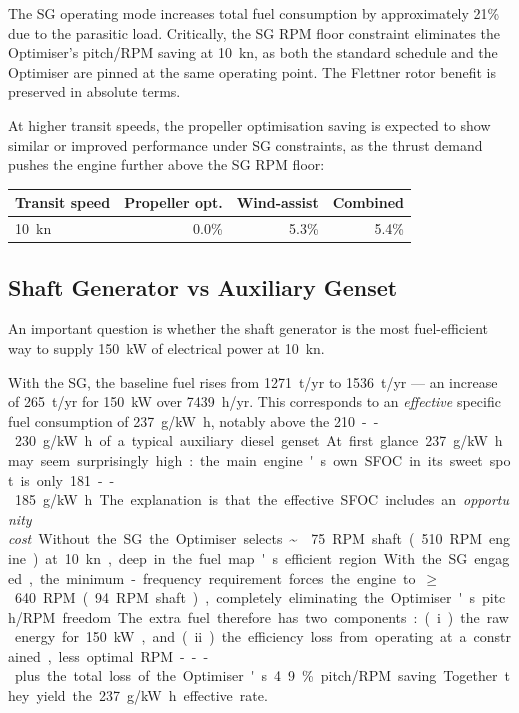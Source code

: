 \documentclass[a4paper,11pt]{article}
\begin{document}
The SG operating mode increases total fuel consumption by approximately
21\% due to the parasitic load.  Critically, the SG RPM floor
constraint eliminates the Optimiser's pitch/RPM saving at \SI{10}{\knot}, as
both the standard schedule and the Optimiser are pinned at the same operating
point.  The Flettner rotor benefit is preserved in absolute terms.

At higher transit speeds, the propeller optimisation saving is expected to show
similar or improved performance under SG constraints, as the thrust demand
pushes the engine further above the SG RPM floor:

\begin{center}
\begin{tabular}{lrrr}
\toprule
Transit speed & Propeller opt. & Wind-assist & Combined\\[0pt]
\midrule
\SI{10}{\knot} & 0.0\% & 5.3\% & 5.4\%\\[0pt]
\bottomrule
\end{tabular}
\end{center}

\subsection{Shaft Generator vs Auxiliary Genset}
\label{sec:org8dceb61}

An important question is whether the shaft generator is the most fuel-efficient
way to supply \SI{150}{\kilo\watt} of electrical power at \SI{10}{\knot}.

With the SG, the baseline fuel rises from \SI{1271}{t/yr} to \SI{1536}{t/yr} ---
an increase of \SI{265}{t/yr} for \SI{150}{\kilo\watt} over \SI{7439}{h/yr}.
This corresponds to an \emph{effective} specific fuel consumption of
\SI{237}{\gram/\kilo\watt\hour}, notably above the
\SI{210}--\SI{230}{\gram/\kilo\watt\hour} of a typical auxiliary diesel genset.

At first glance \SI{237}{\gram/\kilo\watt\hour} may seem surprisingly high:
the main engine's own SFOC in its sweet spot is only
\SI{181}--\SI{185}{\gram/\kilo\watt\hour}.  The explanation is that the
effective SFOC includes an \emph{opportunity cost}.  Without the SG the Optimiser
selects \textasciitilde{}\SI{75}{RPM} shaft (\SI{510}{RPM} engine) at \SI{10}{\knot}, deep in
the fuel map's efficient region.  With the SG engaged, the minimum-frequency
requirement forces the engine to \(\geq\)\SI{640}{RPM} (\SI{94}{RPM} shaft),
completely eliminating the Optimiser's pitch/RPM freedom.  The extra fuel
therefore has two components: (i) the raw energy for \SI{150}{\kilo\watt}, and
(ii) the efficiency loss from operating at a constrained, less optimal RPM ---
plus the total loss of the Optimiser's 4.9\% pitch/RPM saving.
Together they yield the \SI{237}{\gram/\kilo\watt\hour} effective rate.
\end{document}
